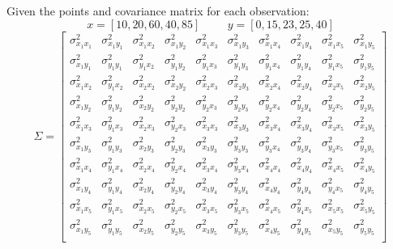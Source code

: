Given the points and covariance matrix for each observation: 
\[
x = [10,20,60,40,85] \hspace{1cm} y = [0,15,23,25,40]
\]
\[
\Sigma = 
\begin{bmatrix}
\sigma_{x_1x_1}^2 & \sigma_{x_1y_1}^2 & \sigma_{x_1x_2}^2 & \sigma_{x_1y_2}^2 & \sigma_{x_1x_3}^2 & \sigma_{x_1y_3}^2 & \sigma_{x_1x_4}^2 & \sigma_{x_1y_4}^2 & \sigma_{x_1x_5}^2 & \sigma_{x_1y_5}^2  \\ 
\sigma_{x_1y_1}^2 & \sigma_{y_1y_1}^2 & \sigma_{y_1x_2}^2 & \sigma_{y_1y_2}^2 & \sigma_{y_1x_3}^2 & \sigma_{y_1y_3}^2 & \sigma_{y_1x_4}^2 & \sigma_{y_1y_4}^2 & \sigma_{y_1x_5}^2 & \sigma_{y_1y_5}^2  \\ 
\sigma_{x_1x_2}^2 & \sigma_{y_1x_2}^2 & \sigma_{x_2x_2}^2 & \sigma_{x_2y_2}^2 & \sigma_{x_2x_3}^2 & \sigma_{x_2y_3}^2 & \sigma_{x_2x_4}^2 & \sigma_{x_2y_4}^2 & \sigma_{x_2x_5}^2 & \sigma_{x_2y_5}^2  \\ 
\sigma_{x_1y_2}^2 & \sigma_{y_1y_2}^2 & \sigma_{x_2y_2}^2 & \sigma_{y_2y_2}^2 & \sigma_{y_2x_3}^2 & \sigma_{y_2y_3}^2 & \sigma_{y_2x_4}^2 & \sigma_{y_2y_4}^2 & \sigma_{y_2x_5}^2 & \sigma_{y_2y_5}^2  \\ 
\sigma_{x_1x_3}^2 & \sigma_{y_1x_3}^2 & \sigma_{x_2x_3}^2 & \sigma_{y_2x_3}^2 & \sigma_{x_3x_3}^2 & \sigma_{x_3y_3}^2 & \sigma_{x_3x_4}^2 & \sigma_{x_3y_4}^2 & \sigma_{x_3x_5}^2 & \sigma_{x_3y_5}^2  \\ 
\sigma_{x_1y_3}^2 & \sigma_{y_1y_3}^2 & \sigma_{x_2y_3}^2 & \sigma_{y_2y_3}^2 & \sigma_{x_3y_3}^2 & \sigma_{y_3y_3}^2 & \sigma_{y_3x_4}^2 & \sigma_{y_3y_4}^2 & \sigma_{y_3x_5}^2 & \sigma_{y_3y_5}^2  \\ 
\sigma_{x_1x_4}^2 & \sigma_{y_1x_4}^2 & \sigma_{x_2x_4}^2 & \sigma_{y_2x_4}^2 & \sigma_{x_3x_4}^2 & \sigma_{y_3x_4}^2 & \sigma_{x_4x_4}^2 & \sigma_{x_4y_4}^2 & \sigma_{x_4x_5}^2 & \sigma_{x_4y_5}^2  \\ 
\sigma_{x_1y_4}^2 & \sigma_{y_1y_4}^2 & \sigma_{x_2y_4}^2 & \sigma_{y_2y_4}^2 & \sigma_{x_3y_4}^2 & \sigma_{y_3y_4}^2 & \sigma_{x_4y_4}^2 & \sigma_{y_4y_4}^2 & \sigma_{y_4x_5}^2 & \sigma_{y_4y_5}^2  \\ 
\sigma_{x_1x_5}^2 & \sigma_{y_1x_5}^2 & \sigma_{x_2x_5}^2 & \sigma_{y_2x_5}^2 & \sigma_{x_3x_5}^2 & \sigma_{y_3x_5}^2 & \sigma_{x_4x_5}^2 & \sigma_{y_4x_5}^2 & \sigma_{x_5x_5}^2 & \sigma_{x_5y_5}^2  \\ 
\sigma_{x_1y_5}^2 & \sigma_{y_1y_5}^2 & \sigma_{x_2y_5}^2 & \sigma_{y_2y_5}^2 & \sigma_{x_3y_5}^2 & \sigma_{y_3y_5}^2 & \sigma_{x_4y_5}^2 & \sigma_{y_4y_5}^2 & \sigma_{x_5y_5}^2 & \sigma_{y_5y_5}^2  \\ 
\end{bmatrix}
\]
